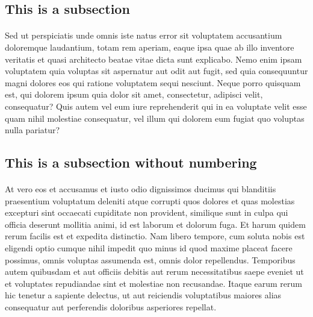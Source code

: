 \documentclass[a4paper]{article}
\begin{document}
\subsection{This is a subsection}
\paragraph{}
Sed ut perspiciatis unde omnis iste natus error sit voluptatem accusantium doloremque laudantium, totam rem aperiam,
eaque ipsa quae ab illo inventore veritatis et quasi architecto beatae vitae dicta sunt explicabo. Nemo enim ipsam
voluptatem quia voluptas sit aspernatur aut odit aut fugit, sed quia consequuntur magni dolores eos qui ratione
voluptatem sequi nesciunt. Neque porro quisquam est, qui dolorem ipsum quia dolor sit amet, consectetur, adipisci
velit, consequatur? Quis autem vel eum iure reprehenderit qui in ea voluptate velit esse quam nihil molestiae
consequatur, vel illum qui dolorem eum fugiat quo voluptas nulla pariatur?

\begin{table}[h!]
\centering
\caption{Fisher's Iris data}
\label{tab:table1}

\end{table}

\subsection*{This is a subsection without numbering}
\paragraph{}
At vero eos et accusamus et iusto odio dignissimos ducimus qui blanditiis praesentium voluptatum deleniti atque
corrupti quos dolores et quas molestias excepturi sint occaecati cupiditate non provident, similique sunt in culpa
qui officia deserunt mollitia animi, id est laborum et dolorum fuga. Et harum quidem rerum facilis est et expedita
distinctio. Nam libero tempore, cum soluta nobis est eligendi optio cumque nihil impedit quo minus id quod maxime
placeat facere possimus, omnis voluptas assumenda est, omnis dolor repellendus. Temporibus autem quibusdam et aut
officiis debitis aut rerum necessitatibus saepe eveniet ut et voluptates repudiandae sint et molestiae non recusandae.
Itaque earum rerum hic tenetur a sapiente delectus, ut aut reiciendis voluptatibus maiores alias consequatur aut
perferendis doloribus asperiores repellat.
\end{document}
